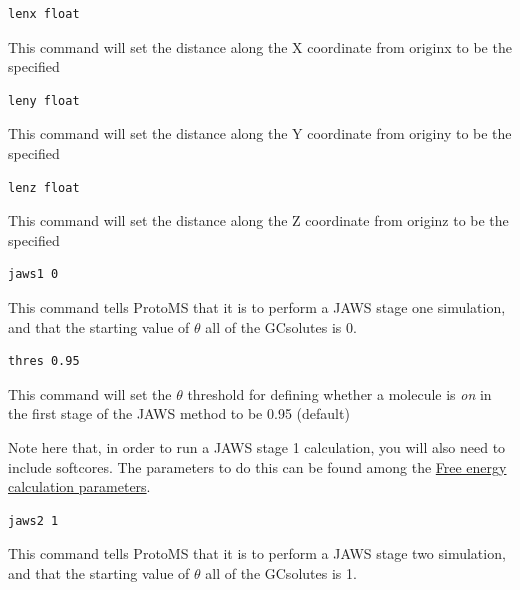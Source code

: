 \documentclass[letterpaper,10pt,english]{sphinxmanual}
\begin{document}
\begin{Verbatim}[frame=single,commandchars=\\\{\}]
lenx float
\end{Verbatim}

This command will set the distance along the X coordinate from originx to be the specified 

\begin{Verbatim}[frame=single,commandchars=\\\{\}]
leny float
\end{Verbatim}

This command will set the distance along the Y coordinate from originy to be the specified 

\begin{Verbatim}[frame=single,commandchars=\\\{\}]
lenz float
\end{Verbatim}

This command will set the distance along the Z coordinate from originz to be the specified 

\begin{Verbatim}[frame=single,commandchars=\\\{\}]
jaws1 0
\end{Verbatim}

This command tells ProtoMS that it is to perform a JAWS stage one simulation, and that the starting value of \(\theta\) all of the GCsolutes is 0.

\begin{Verbatim}[frame=single,commandchars=\\\{\}]
thres 0.95
\end{Verbatim}

This command will set the \(\theta\) threshold for defining whether a molecule is \emph{on} in the first stage of the JAWS method to be 0.95 (default)

Note here that, in order to run a JAWS stage 1 calculation, you will also need to include softcores. The parameters to do this can be found among the {\hyperref[protoms:free-energy-calculation-parameters]{Free energy calculation parameters}}.

\begin{Verbatim}[frame=single,commandchars=\\\{\}]
jaws2 1
\end{Verbatim}

This command tells ProtoMS that it is to perform a JAWS stage two simulation, and that the starting value of \(\theta\) all of the GCsolutes is 1.
\end{document}
